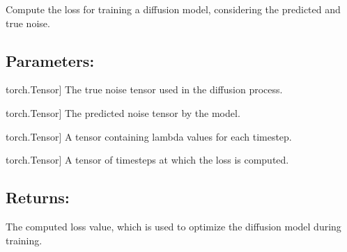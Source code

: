 \documentclass[a4paper,10pt,english]{sphinxmanual}
\begin{document}

\begin{fulllineitems}
\label{\detokenize{models:fireDiff.Models.utils.loss_function}}
\pysigstartsignatures
{}
\pysigstopsignatures
\sphinxAtStartPar
Compute the loss for training a diffusion model, considering the predicted
and true noise.


\subsection{Parameters:}
\label{\detokenize{models:id50}}\begin{description}
\sphinxlineitem{v\_tau}{[}torch.Tensor{]}
\sphinxAtStartPar
The true noise tensor used in the diffusion process.

\sphinxlineitem{v\_hat}{[}torch.Tensor{]}
\sphinxAtStartPar
The predicted noise tensor by the model.

\sphinxlineitem{lambda\_tau}{[}torch.Tensor{]}
\sphinxAtStartPar
A tensor containing lambda values for each timestep.

\sphinxlineitem{t}{[}torch.Tensor{]}
\sphinxAtStartPar
A tensor of timesteps at which the loss is computed.

\end{description}


\subsection{Returns:}
\label{\detokenize{models:id51}}\begin{description}
\sphinxAtStartPar
The computed loss value, which is used to optimize the diffusion model
during training.

\end{description}



\end{fulllineitems}
\end{document}
